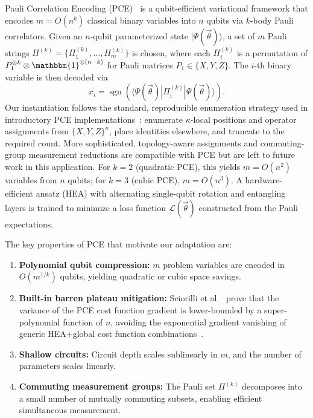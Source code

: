 \documentclass[conference,10pt]{IEEEtran}
\DeclareMathOperator{\sgn}{sgn}
\begin{document}
Pauli Correlation Encoding (PCE)~\cite{Sciorilli24} is a
qubit-efficient variational framework that encodes $m = O(n^k)$
classical binary variables into $n$ qubits via $k$-body Pauli
correlators. Given an $n$-qubit parameterized state
$|\Psi(\vec{\theta})\rangle$, a set of $m$ Pauli strings $\Pi^{(k)} =
\{\Pi_1^{(k)}, \ldots, \Pi_m^{(k)}\}$ is chosen, where each
$\Pi_i^{(k)}$ is a permutation of $P_1^{\otimes k} \otimes
\mathbbm{1}^{\otimes (n-k)}$ for Pauli matrices $P_1 \in \{X, Y, Z\}$.
The $i$-th binary variable is then decoded via
\begin{equation}
    x_i = \sgn\!\left(
        \langle \Psi(\vec{\theta}) |
        \Pi_i^{(k)} |
        \Psi(\vec{\theta}) \rangle
    \right).
    \label{eq:pce_decode}
\end{equation}
Our instantiation follows the standard, reproducible enumeration
strategy used in introductory PCE implementations~\cite{Sciorilli24,
IBMpce}: enumerate $\kappa$-local positions and operator assignments
from $\{X,Y,Z\}^\kappa$, place identities elsewhere, and truncate to
the required count. More sophisticated, topology-aware assignments and
commuting-group measurement reductions are compatible with PCE but are
left to future work in this application. For $k=2$ (quadratic PCE),
this yields $m = O(n^2)$ variables from $n$ qubits; for $k=3$ (cubic
PCE), $m = O(n^3)$. A hardware-efficient ansatz (HEA) with alternating
single-qubit rotation and entangling layers is trained to minimize a
loss function $\mathcal{L}(\vec{\theta})$ constructed from the Pauli
expectations.

The key properties of PCE that motivate our adaptation are:
\begin{enumerate}
    \item \textbf{Polynomial qubit compression:} $m$ problem variables
    are encoded in $O(m^{1/k})$ qubits, yielding quadratic or cubic
    space savings.
    \item \textbf{Built-in barren plateau mitigation:} Sciorilli et
    al.~\cite{Sciorilli24} prove that the variance of the PCE cost
    function gradient is lower-bounded by a super-polynomial function
    of $n$, avoiding the exponential gradient vanishing of generic
    HEA+global cost function combinations~\cite{Cerezo21}.
    \item \textbf{Shallow circuits:} Circuit depth scales sublinearly
    in $m$, and the number of parameters scales linearly.
    \item \textbf{Commuting measurement groups:} The Pauli set
    $\Pi^{(k)}$ decomposes into a small number of mutually commuting
    subsets, enabling efficient simultaneous measurement.
\end{enumerate}
\end{document}
